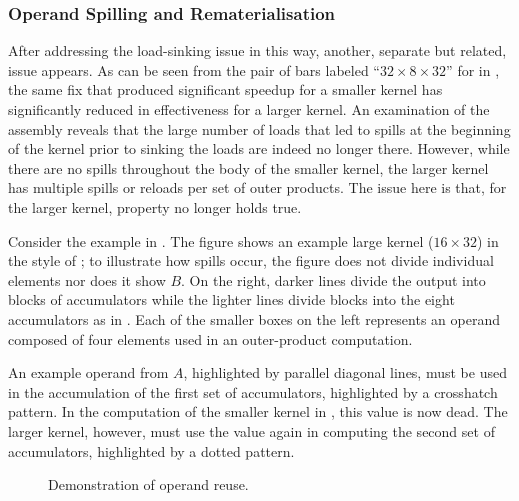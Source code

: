 \documentclass[\main/thesis.tex]{subfiles}
\begin{document}
\subsubsection{Operand Spilling and Rematerialisation}
After addressing the load-sinking issue in this way, another, separate but related, issue appears.
As can be seen from the pair of bars labeled ``$32 \times 8 \times 32$'' for  in , the same fix that produced significant speedup for a smaller kernel has significantly reduced in effectiveness for a larger kernel.
An examination of the assembly reveals that the large number of loads that led to spills at the beginning of the kernel prior to sinking the loads are indeed no longer there.
However, while there are no spills throughout the body of the smaller kernel, the larger kernel has multiple spills or reloads per set of outer products.
The issue here is that, for the larger kernel, property  no longer holds true.

Consider the example in .
The figure shows an example large kernel ($16 \times 32$) in the style of ; to illustrate how spills occur, the figure does not divide individual elements nor does it show $B$.
On the right, darker lines divide the output into blocks of accumulators while the lighter lines divide blocks into the eight accumulators as in .
Each of the smaller boxes on the left represents an operand composed of four  elements used in an outer-product computation.

An example operand from $A$, highlighted by parallel diagonal lines, must be used in the accumulation of the first set of accumulators, highlighted by a crosshatch pattern.
In the computation of the smaller kernel in , this value is now \gls{dead}.
The larger kernel, however, must use the value again in computing the second set of accumulators, highlighted by a dotted pattern.

\begin{figure}[t]
  \centering
  \caption{Demonstration of operand reuse.}
  \label{fig:opReuse}
\end{figure}
\end{document}
